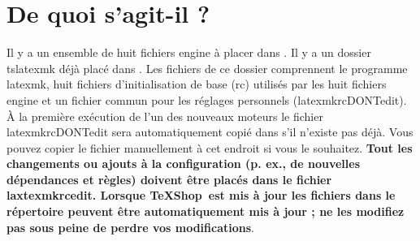 \documentclass[11pt,french]{article}
\newcommand{\TS}{\textsf{\TeX Shop}}
\newcommand{\latexmk}{\textsf{latexmk}}
\newcommand{\cmd}[1]{\textsf{#1}}
\begin{document}

%

\section{De quoi s'agit-il ?}

Il y a un ensemble de huit fichiers \cmd{engine} à placer dans . Il y a un dossier \cmd{tslatexmk} déjà placé dans . Les fichiers de ce dossier comprennent le programme \cmd{latexmk}, huit fichiers d'initialisation de base (\cmd{rc}) utilisés par les huit fichiers \cmd{engine} et un fichier commun pour les réglages personnels (\cmd{latexmkrcDONTedit}). À la première exécution de l'un des nouveaux moteurs le fichier \cmd{latexmkrcDONTedit} sera automatiquement copié dans  s'il  n'existe pas déjà. Vous pouvez copier le fichier manuellement à cet endroit si vous le souhaitez. \textbf{Tout les changements ou ajouts à la configuration (p. ex., de nouvelles dépendances et règles) doivent être placés dans le fichier \cmd{laxtexmkrcedit}. Lorsque \TS\ est mis à jour les fichiers dans le répertoire  peuvent être automatiquement mis à jour ; ne les modifiez pas sous peine de perdre vos modifications}.
\end{document}
